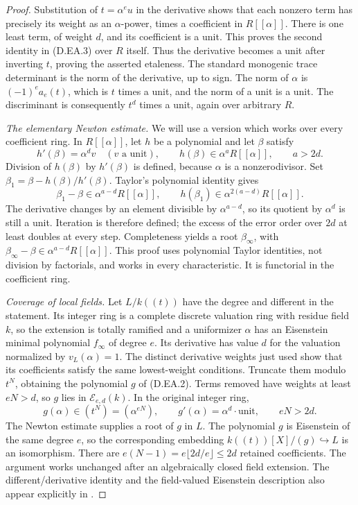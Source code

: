 \begin{proof}
Substitution of $t=\alpha^e u$ in the derivative shows that each
nonzero term has precisely its weight as an $\alpha$-power, times
a coefficient in $R[[\alpha]]$. There is one least term, of weight
$d$, and its coefficient is a unit. This proves the second identity
in (D.EA.3) over $R$ itself. Thus the derivative becomes a unit after
inverting $t$, proving the asserted etaleness. The standard monogenic
trace determinant is the norm of the derivative, up to sign. The norm
of $\alpha$ is $(-1)^e a_e(t)$, which is $t$ times a unit, and the norm
of a unit is a unit. The discriminant is consequently $t^d$ times
a unit, again over arbitrary $R$.

\emph{The elementary Newton estimate.}
We will use a version which works over every coefficient ring.
In $R[[\alpha]]$, let $h$ be a polynomial and let $\beta$ satisfy
\[
 h'(\beta)=\alpha^d v\quad(v\text{ a unit}),\qquad
 h(\beta)\in\alpha^aR[[\alpha]],\qquad a>2d.
                                                               \tag{D.EA.5}
\]
Division of $h(\beta)$ by $h'(\beta)$ is defined, because
$\alpha$ is a nonzerodivisor. Set
$\beta_1=\beta-h(\beta)/h'(\beta)$. Taylor's polynomial identity
gives
\[
 \beta_1-\beta\in\alpha^{a-d}R[[\alpha]],\qquad
 h(\beta_1)\in\alpha^{2(a-d)}R[[\alpha]].               \tag{D.EA.6}
\]
The derivative changes by an element divisible by $\alpha^{a-d}$,
so its quotient by $\alpha^d$ is still a unit. Iteration is therefore
defined; the excess of the error order over $2d$ at least doubles
at every step. Completeness yields a root $\beta_\infty$, with
$\beta_\infty-\beta\in\alpha^{a-d}R[[\alpha]]$.
This proof uses polynomial Taylor identities, not division by
factorials, and works in every characteristic. It is functorial in
the coefficient ring.

\emph{Coverage of local fields.}
Let $L/k((t))$ have the degree and different in the statement.
Its integer ring is a complete discrete valuation ring with residue
field $k$, so the extension is totally ramified and a uniformizer
$\alpha$ has an Eisenstein minimal polynomial $f_\infty$ of degree
$e$. Its derivative has value $d$ for the valuation normalized by
$v_L(\alpha)=1$. The distinct derivative weights just used show
that its coefficients satisfy the same lowest-weight conditions.
Truncate them modulo $t^N$, obtaining the polynomial $g$ of
(D.EA.2). Terms removed have weights at least $eN>d$, so $g$ lies
in $\mathcal E_{e,d}(k)$. In the original integer ring,
\[
 g(\alpha)\in(t^N)=(\alpha^{eN}),\qquad
 g'(\alpha)=\alpha^d\cdot\text{unit},\qquad eN>2d.
\]
The Newton estimate supplies a root of $g$ in $L$. The polynomial
$g$ is Eisenstein of the same degree $e$, so the corresponding
embedding $k((t))[X]/(g)\hookrightarrow L$ is an isomorphism.
There are $e(N-1)=e\lfloor2d/e\rfloor\le2d$ retained coefficients.
The argument works unchanged after an algebraically closed field
extension. The different/derivative identity and the field-valued
Eisenstein description also appear explicitly in
\citet[Section 2 and equation (4.1)]{Yasuda2025EisensteinB}.


\end{proof}
